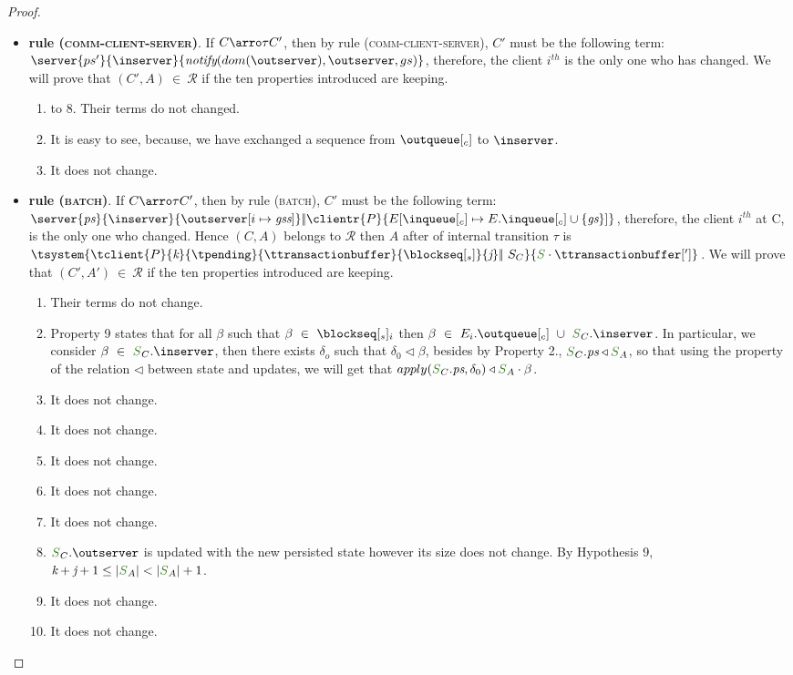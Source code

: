 \begin{proof}
\begin{itemize}
\begin{itemize}
					
				\item {\bf rule (\textsc{comm-client-server})}. If $C \arroi{\tau} C'$, then by rule (\textsc{\footnotesize{comm-client-server}}), $C'$ must be the following term: $\server{ps'}{\inserver}{\notify{dom(\outserver)}{\outserver}{gs}}$, therefore, the client $i^{th}$ is the only one who has changed. We will prove that $(C',A) \ \in \ \mathcal{R}$ if the ten properties introduced are keeping.				
					\begin{enumerate}
						\item to 8. Their terms do not changed.
						\setcounter{enumi}{8}	
						\item It is easy to see, because, we have exchanged a sequence from $\outclient$ to $\inserver$. 
						\item It does not change.
						\end{enumerate}
				


				
						\item {\bf rule (\textsc{batch})}. If $C \arroi{\tau} C'$, then by rule (\textsc{\footnotesize{batch}}), $C'$ must be the following term: $\server{\state}{\inserver}{\update{\outserver}{i}{\gss}} \bigpar 
		\clientr{P}{\update{E}{\inclient}{E.\inclient \cup \{\gs\}}}$, therefore, the client $i^{th}$ at C, is the only one who changed. Hence	$(C,A)$ belongs to $\mathcal{R}$ then $A$ after of internal transition $\tau$ is $\tsystem{\tclient{\tprogram}{\tknown}{\tpending}{\ttransactionbuffer}{\tsent}{\treceivebuffer}\bigpar\ S_C}{\queuemessage \cdot \tsenthead}$. We will prove that $(C',A') \ \in \ \mathcal{R}$ if the ten properties introduced are keeping.	
				\begin{enumerate}
						\item Their terms do not change.
						\item Property 9 states that for all $\beta$ such that $\beta \ \in \ \tsent_i$ then $\beta \ \in \ E_{i}.\outclient \ \cup \ \queuemessage_C.\inserver$. In particular, we consider $\beta \ \in \ \queuemessage_C.\inserver$, then there exists $\delta_o$ such that $\delta_0 \triangleleft \beta$, besides by Property 2., $\queuemessage_C.\state \triangleleft \queuemessage_A$, so that using the property of the relation $\triangleleft$ between state and updates, we will get that $apply(\queuemessage_C.\state,\delta_0) \triangleleft \queuemessage_A \cdot \beta$.
							\item It does not change.
							\item It does not change.
							\item It does not change.
							\item It does not change.
							\item It does not change.
							\item $\queuemessage_C.\outserver$ is updated with the new persisted state however its size does not change. By Hypothesis 9, $\tknown + \treceivebuffer + 1 \leq |\queuemessage_A| < |\queuemessage_A| + 1$.
							\item It does not change.
							\item It does not change.


\end{enumerate}
\end{itemize}
\end{itemize}
\end{proof}
